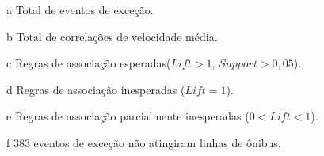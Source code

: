 \documentclass[
	12pt,				%
	oneside,			%
	a4paper,			%
	english,			%
	brazil				%
	]{abntex2ppgsi}
\begin{document}
{{{\begin{apendicesenv}
\begin{table}[!htb]
\begin{threeparttable}
\begin{tablenotes}
            \item[a] Total de eventos de exceção.
            \item[b] Total de correlações de velocidade média.
            \item[c] Regras de associação esperadas($Lift > 1$, $Support > 0,05$).
            \item[d] Regras de associação inesperadas ($Lift = 1$).
            \item[e] Regras de associação parcialmente inesperadas ($0 < Lift < 1$).
            \item[f] 383 eventos de exceção não atingiram linhas de ônibus.
        \end{tablenotes}
\end{threeparttable}
\end{table}


\end{apendicesenv}}}}
\end{document}

